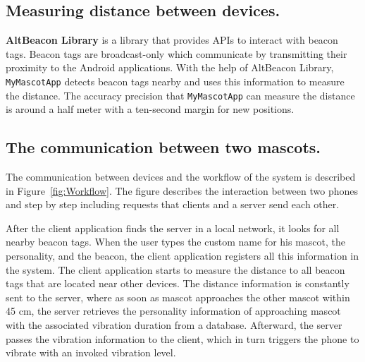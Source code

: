 \subsection{Measuring distance between devices.}
\label{subsec:measuring-distance-between-devices.}
\textbf{AltBeacon Library} is a library that provides APIs to interact with beacon tags.
Beacon tags are broadcast-only which communicate by transmitting their proximity to the Android applications.
With the help of AltBeacon Library, \texttt{MyMascotApp} detects beacon tags nearby
and uses this information to measure the distance.
The accuracy precision that \texttt{MyMascotApp} can measure the distance is around a half meter
with a ten-second margin for new positions.

\subsection{The communication between two mascots.}
\label{subsec:the-communication-between-two-mascots.}
The communication between devices and the workflow of the system is described in Figure~\ref{fig:Workflow}.
The figure describes the interaction between two phones and step by step including requests
that clients and a server send each other.

After the client application finds the server in a local network, it looks for all nearby beacon tags.
When the user types the custom name for his mascot, the personality, and the beacon, the client
application registers all this information in the system.
The client application starts to measure the distance to all beacon tags that are located near other devices.
The distance information is constantly sent to the server, where as soon as mascot approaches the other mascot within
45 cm, the server retrieves the personality information of approaching mascot with the associated vibration duration
from a database.
Afterward, the server passes the vibration information to the client, which in turn triggers the
phone to vibrate with an invoked vibration level.

